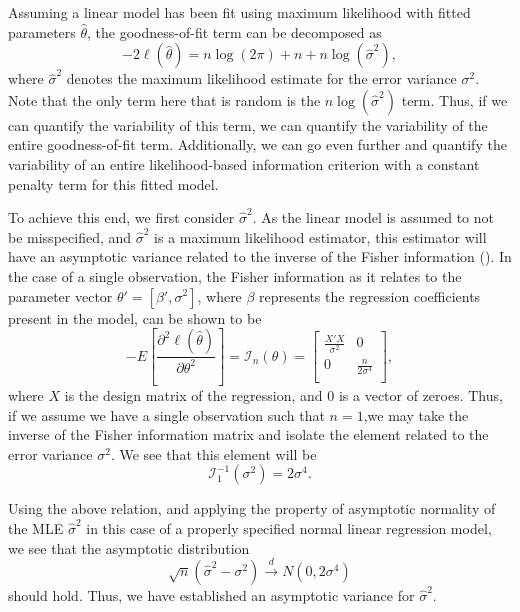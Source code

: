 \documentclass[12pt]{article} %
\theoremstyle{definition}
\begin{document}
		Assuming a linear model has been fit using maximum likelihood with fitted parameters $\hat{\theta}$, the goodness-of-fit term can be decomposed as
		\begin{equation}
			-2 \ell (\hat{\theta}  ) = n \log(2 \pi) + n + n \log(\hat{\sigma}^2 ) ,
		\end{equation}
		where $\hat{\sigma}^2$ denotes the maximum likelihood estimate for the error variance $\sigma^2$. Note that the only term here that is random is
		the $n \log(\hat{\sigma}^2)$ term. Thus, if we can quantify the variability of this term, we can quantify the variability of the entire goodness-of-fit
		term. Additionally, we can go even further and quantify the variability of an entire likelihood-based information criterion with a constant penalty
		term for this fitted model.

		To achieve this end, we first consider $\hat{\sigma}^2$. As the linear model is assumed to not be misspecified, and $\hat{\sigma}^2$ is a maximum likelihood
		estimator, this estimator will have an asymptotic variance related to the inverse of the Fisher information (\cite{Fisher}). In the case of a single
		observation, the Fisher information as it relates to the parameter vector $\theta' = [\beta', \sigma^2]$, where $\beta$ represents the regression coefficients
		present in the model, can be shown to be
		\begin{equation*}
			- E \left[ \frac{\partial^2 \ell (\hat{\theta}  )}{\partial \theta^2} \right] = \mathcal{I}_{n}(\theta) =
			\begin{bmatrix}
				\frac{X' X}{\sigma^2} & 0 \\
				0 & \frac{n}{2 \sigma^4} \\
			\end{bmatrix}
			,
		\end{equation*}
		where $X$ is the design matrix of the regression, and $0$ is a vector of zeroes. Thus, if we assume we have a single observation
		such that $n=1$,we may take the inverse of the Fisher information matrix and isolate the element related to the error variance $\sigma^2$. We see that
		this element will be
		\begin{equation*}
			\mathcal{I}_{1}^{-1}(\sigma ^2) = 2 \sigma ^4 .
		\end{equation*}
		
		Using the above relation, and applying the property of asymptotic normality of the MLE $\hat{\sigma}^2$ in this case of a properly specified normal linear
		regression model, we see that the asymptotic distribution
		\begin{equation*}
			\sqrt{n} (\hat{\sigma}^2 - \sigma^2) \xrightarrow[]{d} N(0, 2 \sigma ^4 )
		\end{equation*}
		should hold. Thus, we have established an asymptotic variance for $\hat{\sigma}^2$.
\end{document}
